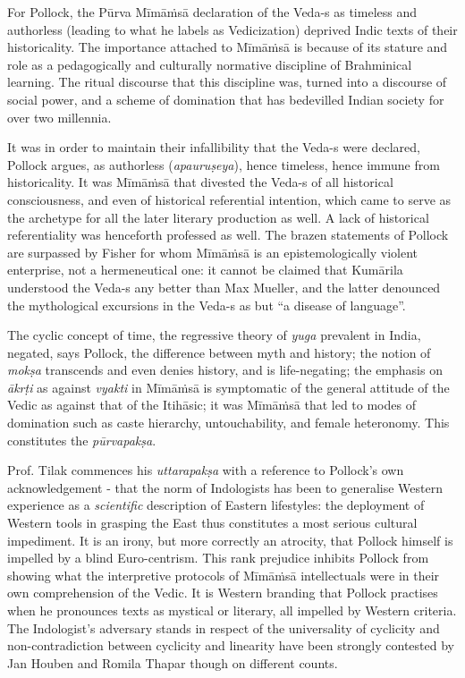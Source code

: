 For Pollock, the Pūrva Mīmāṁsā declaration of the Veda-s as timeless and authorless (leading to what he labels as Vedicization) deprived Indic texts of their historicality. The importance attached to Mīmāṁsā is because of its stature and role as a pedagogically and culturally normative discipline of Brahminical learning. The ritual discourse that this discipline was, turned into a discourse of social power, and a scheme of domination that has bedevilled Indian society for over two millennia. 

It was in order to maintain their infallibility that the Veda-s were declared, Pollock argues, as authorless (\textit{apauruṣeya}), hence timeless, hence immune from historicality. It was Mīmāṁsā that divested the Veda-s of all historical consciousness, and even of historical referential intention, which came to serve as the archetype for all the later literary production as well. A lack of historical referentiality was henceforth professed as well. The brazen statements of Pollock are surpassed by Fisher for whom Mīmāṁsā is an epistemologically violent enterprise, not a hermeneutical one: it cannot be claimed that Kumārila understood the Veda-s any better than Max Mueller, and the latter denounced the mythological excursions in the Veda-s as but “a disease of language”. 

The cyclic concept of time, the regressive theory of \textit{yuga} prevalent in India, negated, says Pollock, the difference between myth and history; the notion of \textit{mokṣa} transcends and even denies history, and is life-negating; the emphasis on \textit{ākrṭi} as against \textit{vyakti} in Mīmāṁsā is symptomatic of the general attitude of the Vedic as against that of the Itihāsic; it was Mīmāṁsā that led to modes of domination such as caste hierarchy, untouchability, and female heteronomy. This constitutes the \textit{pūrvapakṣa}.

 Prof. Tilak commences his \textit{uttarapakṣa} with a reference to Pollock’s own acknowledgement - that the norm of Indologists has been to generalise Western experience as a \textit{scientific} description of Eastern lifestyles: the deployment of Western tools in grasping the East thus constitutes a most serious cultural impediment. It is an irony, but more correctly an atrocity, that Pollock himself is impelled by a blind Euro-centrism. This rank prejudice inhibits Pollock from showing what the interpretive protocols of Mīmāṁsā intellectuals were in their own comprehension of the Vedic. It is Western branding that Pollock practises when he pronounces texts as mystical or literary, all impelled by Western criteria. The Indologist’s adversary stands in respect of the universality of cyclicity and non-contradiction between cyclicity and linearity have been strongly contested by Jan Houben and Romila Thapar though on different counts. 


